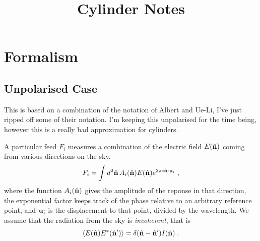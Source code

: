 \documentclass[prd,twocolumn,nofootinbib]{revtex4}
\begin{document}
\title{Cylinder Notes}

\maketitle



\section{Formalism}

\subsection{Unpolarised Case}

This is based on a combination of the notation of Albert and Ue-Li, I've just
ripped off some of their notation. I'm keeping this unpolarised for the time
being, however this is a really bad approximation for cylinders.

A particular feed $F_i$ measures a combination of the electric field $E(\hat{\mathbf{n}})$
coming from various directions on the sky.
\begin{equation}
F_i = \int d^2\hat{\mathbf{n}} \, A_i(\hat{\mathbf{n}}) E(\hat{\mathbf{n}}) e^{2 \pi i \hat{\mathbf{n}}\cdot\mathbf{u}_i}\; ,
\end{equation}
where the function $A_i(\hat{\mathbf{n}})$ gives the amplitude of the reponse in that
direction, the exponential factor keeps track of the phase relative to an
arbitrary reference point, and $\mathbf{u}_i$ is the displacement to that point,
divided by the wavelength. We assume that the radiation from the sky is
\emph{incoherent}, that is
\begin{equation}
\left\langle E(\hat{\mathbf{n}}) E^* (\hat{\mathbf{n}}') \right\rangle = \delta(\hat{\mathbf{n}} - \hat{\mathbf{n}}') I(\hat{\mathbf{n}}) \; .
\end{equation}
\end{document}

